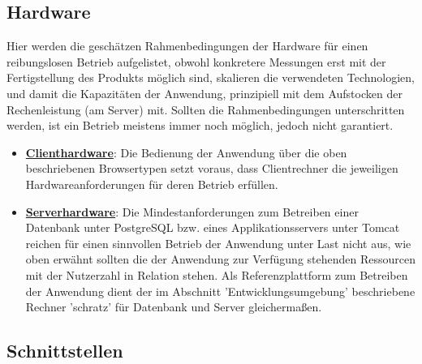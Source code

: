 \documentclass{article}
\begin{document}
\subsection{Hardware}

Hier werden die geschätzen Rahmenbedingungen der Hardware für einen reibungslosen Betrieb aufgelistet, obwohl konkretere Messungen erst mit der Fertigstellung des Produkts möglich sind, skalieren die verwendeten Technologien, und damit die Kapazitäten der Anwendung, prinzipiell mit dem Aufstocken der Rechenleistung (am Server) mit. Sollten die Rahmenbedingungen unterschritten werden, ist ein Betrieb meistens immer noch möglich, jedoch nicht garantiert.

\begin{itemize}
\item \underline{\textbf{Clienthardware}}: \linebreak
Die Bedienung der Anwendung über die oben beschriebenen Browsertypen setzt voraus, dass Clientrechner die jeweiligen Hardwareanforderungen für deren Betrieb erfüllen.
\item \underline{\textbf{Serverhardware}}: \linebreak
Die Mindestanforderungen zum Betreiben einer Datenbank unter PostgreSQL bzw. eines Applikationsservers unter Tomcat reichen für einen sinnvollen Betrieb der Anwendung unter Last nicht aus, wie oben erwähnt sollten die der Anwendung zur Verfügung stehenden Ressourcen mit der Nutzerzahl in Relation stehen. Als Referenzplattform zum Betreiben der Anwendung dient der im Abschnitt 'Entwicklungsumgebung' beschriebene Rechner 'schratz' für Datenbank und Server gleichermaßen.
\end{itemize}

\subsection{Schnittstellen}
\end{document}
